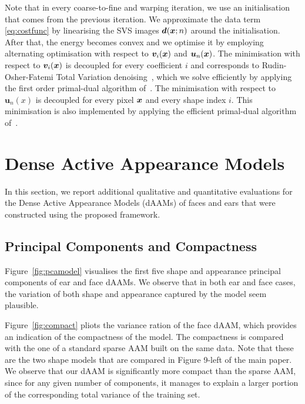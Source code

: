 Note that in every coarse-to-fine and warping iteration, we use an initialisation that comes from the previous iteration. We approximate the data term \eqref{eq:costfunc} by linearising the SVS images $\bm{d}(\boldsymbol{x};n)$ around the initialisation. After that, the energy becomes convex and we optimise it by employing alternating optimisation with respect to $\bm{v}_i(\boldsymbol{x})$ and $\bm{u}_n(\boldsymbol{x})$. The minimisation with respect to $\bm{v}_i(\boldsymbol{x})$ is decoupled for every coefficient $i$ and corresponds to Rudin-Osher-Fatemi Total Variation denoising~\cite{rudin92}, which we solve efficiently by applying the first order primal-dual algorithm of~\cite{Chambolle:Pock:JMIV2011}. The minimisation with respect to $\bm{u}_n(x)$ is decoupled for every pixel $\boldsymbol{x}$ and every shape index $i$. This minimisation is also implemented by applying the efficient primal-dual algorithm of~\cite{Chambolle:Pock:JMIV2011}.

\section{Dense Active Appearance Models}
\label{sec:daam}

In this section, we report additional qualitative and quantitative evaluations for the Dense Active Appearance Models (dAAMs) of faces and ears that were constructed using the proposed framework.



\subsection{Principal Components and Compactness}



Figure~\ref{fig:pcamodel} visualises the first five shape and appearance principal components of ear and face dAAMs. We observe that in both ear and face cases, the variation of both shape and appearance captured by the model seem plausible.


Figure~\ref{fig:compact} pliots the variance ration of the face dAAM, which provides an indication of the compactness of the model. The compactness is compared with the one of a standard sparse AAM built on the same data. Note that these are the two shape models that are compared in Figure 9-left of the main paper. We observe that our dAAM is significantly more compact than the sparse AAM, since for any given number of components, it manages to explain a larger portion of the corresponding total variance of the training set. 


